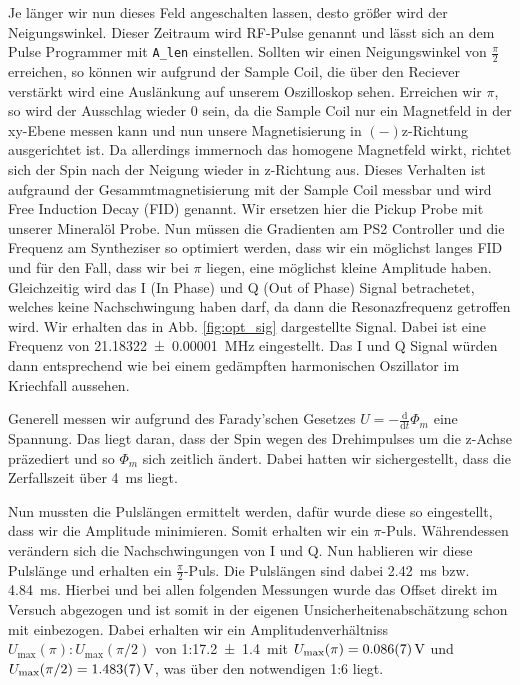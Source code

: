 \documentclass[10pt]{article}
\newenvironment{Figure}
  {\par\medskip\noindent\minipage{\linewidth}}
  {\endminipage\par\medskip}
\begin{document}
\begin{multicols}{2}
Je länger wir nun dieses Feld angeschalten lassen, desto größer wird der Neigungswinkel. Dieser Zeitraum wird RF-Pulse genannt und lässt sich an dem Pulse Programmer mit \texttt{A_len} einstellen. Sollten wir einen Neigungswinkel von $\frac{\pi}{2}$ erreichen, so können wir aufgrund der Sample Coil, die über den Reciever verstärkt wird eine Auslänkung auf unserem Oszilloskop sehen. Erreichen wir $\pi$, so wird der Ausschlag wieder 0 sein, da die Sample Coil nur ein Magnetfeld in der xy-Ebene messen kann und nun unsere Magnetisierung in $(-)$z-Richtung ausgerichtet ist. Da allerdings immernoch das homogene Magnetfeld wirkt, richtet sich der Spin nach der Neigung wieder in z-Richtung aus. Dieses Verhalten ist aufgraund der Gesammtmagnetisierung mit der Sample Coil messbar und wird Free Induction Decay (FID) genannt. Wir ersetzen hier die Pickup Probe mit unserer Mineralöl Probe. Nun müssen die Gradienten am PS2 Controller und die Frequenz am Syntheziser so optimiert werden, dass wir ein möglichst langes FID und für den Fall, dass wir bei $\pi$ liegen, eine möglichst kleine Amplitude haben. Gleichzeitig wird das I (In Phase) und Q (Out of Phase) Signal betrachetet, welches keine Nachschwingung haben darf, da dann die Resonazfrequenz getroffen wird. Wir erhalten das in Abb. \ref{fig:opt_sig} dargestellte Signal. Dabei ist eine Frequenz von \SI{21.18322+-0.00001}{\mega Hz} eingestellt. Das I und Q Signal würden dann entsprechend wie bei einem gedämpften harmonischen Oszillator im Kriechfall aussehen.
  \begin{Figure}
    \centering\resizebox{\textwidth}{!}{}
    \label{fig:opt_sig}
  \end{Figure}
  Generell messen wir aufgrund des Farady'schen Gesetzes $U=-\frac{\text{d}}{\text{d}t}\Phi_m$ eine Spannung. Das liegt daran, dass der Spin wegen des Drehimpulses um die z-Achse präzediert und so $\Phi_m$ sich zeitlich ändert. Dabei hatten wir sichergestellt, dass die Zerfallszeit über \SI{4}{\milli s} liegt.

  Nun mussten die Pulslängen ermittelt werden, dafür wurde diese so eingestellt, dass wir die Amplitude minimieren. Somit erhalten wir ein $\pi$-Puls. Währendessen verändern sich die Nachschwingungen von I und Q. Nun hablieren wir diese Pulslänge und erhalten ein $\frac{\pi}{2}$-Puls. Die Pulslängen sind dabei \SI{2.42}{\milli s} bzw. \SI{4.84}{\milli s}. Hierbei und bei allen folgenden Messungen wurde das Offset direkt im Versuch abgezogen und ist somit in der eigenen Unsicherheitenabschätzung schon mit einbezogen. Dabei erhalten wir ein Amplitudenverhältniss $U_{\text{max}}(\pi):U_{\text{max}}(\pi/2)$ von 1:\SI{17.2+-1.4} mit $U_{\text{max}}(\pi)=\SI{0.086+-0.007}{V}$ und $U_{\text{max}}(\pi/2)=\SI{1.483+-0.007}{V}$, was über den notwendigen 1:6 liegt.



\end{multicols}
\end{document}
